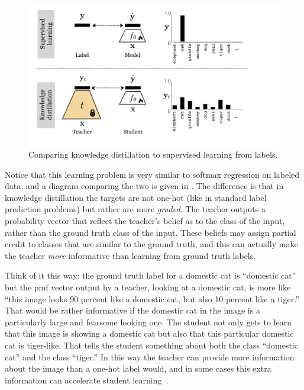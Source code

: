 \begin{figure}[h!]
    \centerline{
    \includegraphics[width=1.0\linewidth]{./figures/transfer_learning/KD_diagram.pdf}
    }
    \caption{Comparing knowledge distillation to supervised learning from labels.}
    \label{fig:transfer_learning:KD_diagram}
\end{figure}

Notice that this learning problem is very similar to softmax regression on labeled data, and a diagram comparing the two is given in \fig{\ref{fig:transfer_learning:KD_diagram}}. The difference is that in knowledge distillation the targets are not one-hot (like in standard label prediction problems) but rather are more \textit{graded}.  %
The teacher outputs a probability vector that reflect the teacher's belief as to the class of the input, rather than the ground truth class of the input. These beliefs may assign partial credit to classes that are similar to the ground truth, and this can actually make the teacher \textit{more} informative than learning from ground truth labels.

Think of it this way: the ground truth label for a domestic cat is ``domestic cat'' but the pmf vector output by a teacher, looking at a domestic cat, is more like ``this image looks 90 percent like a domestic cat, but also 10 percent like a tiger.'' That would be rather informative if the domestic cat in the image is a particularly large and fearsome looking one. The student not only gets to learn that this image is showing a domestic cat but also that this particular domestic cat is tiger-like. That tells the student something about both the class ``domestic cat'' and the class ``tiger.'' In this way the teacher can provide more information about the image than a one-hot label would, and in some cases this extra information can accelerate student learning~\cite{hinton2002training}.


